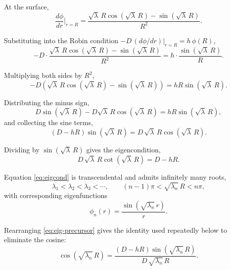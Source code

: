 \documentclass[11pt,a4paper]{article}
\begin{document}
At the surface,
\begin{equation}
\frac{d\phi}{dr}\bigg|_{r=R}
= \frac{\sqrt{\lambda}\,R\cos\!\left(\sqrt{\lambda}\,R\right)
- \sin\!\left(\sqrt{\lambda}\,R\right)}{R^{2}} .
\end{equation}

Substituting into the Robin condition
$-D\,(d\phi/dr)|_{r=R} = h\,\phi(R)$,
\begin{equation}
-D \cdot \frac{\sqrt{\lambda}\,R\cos\!\left(\sqrt{\lambda}\,R\right)
- \sin\!\left(\sqrt{\lambda}\,R\right)}{R^{2}}
= h \cdot \frac{\sin\!\left(\sqrt{\lambda}\,R\right)}{R} .
\end{equation}

Multiplying both sides by $R^{2}$,
\begin{equation}
-D\left(\sqrt{\lambda}\,R\cos\!\left(\sqrt{\lambda}\,R\right)
- \sin\!\left(\sqrt{\lambda}\,R\right)\right)
= hR\sin\!\left(\sqrt{\lambda}\,R\right) .
\end{equation}

Distributing the minus sign,
\begin{equation}
D\sin\!\left(\sqrt{\lambda}\,R\right)
- D\sqrt{\lambda}\,R\cos\!\left(\sqrt{\lambda}\,R\right)
= hR\sin\!\left(\sqrt{\lambda}\,R\right) ,
\end{equation}
and collecting the sine terms,
\begin{equation}
\left(D - hR\right)\sin\!\left(\sqrt{\lambda}\,R\right)
= D\,\sqrt{\lambda}\,R\cos\!\left(\sqrt{\lambda}\,R\right) .
\label{eq:eig-precursor}
\end{equation}

Dividing by $\sin\!\left(\sqrt{\lambda}\,R\right)$ gives the eigencondition,
\begin{equation}
\boxed{\;
D\,\sqrt{\lambda}\,R\cot\!\left(\sqrt{\lambda}\,R\right) = D - hR .
\;}
\label{eq:eigcond}
\end{equation}

Equation \eqref{eq:eigcond} is transcendental and admits infinitely many roots,
\begin{equation}
\lambda_{1} < \lambda_{2} < \lambda_{3} < \cdots ,
\qquad
(n-1)\pi < \sqrt{\lambda_{n}}\,R < n\pi ,
\end{equation}
with corresponding eigenfunctions
\begin{equation}
\phi_{n}(r) = \frac{\sin\!\left(\sqrt{\lambda_{n}}\,r\right)}{r} .
\end{equation}

Rearranging \eqref{eq:eig-precursor} gives the identity used repeatedly below to
eliminate the cosine:
\begin{equation}
\cos\!\left(\sqrt{\lambda_{n}}\,R\right)
= \frac{\left(D - hR\right)\sin\!\left(\sqrt{\lambda_{n}}\,R\right)}
{D\,\sqrt{\lambda_{n}}\,R} .
\label{eq:coselim}
\end{equation}
\end{document}
